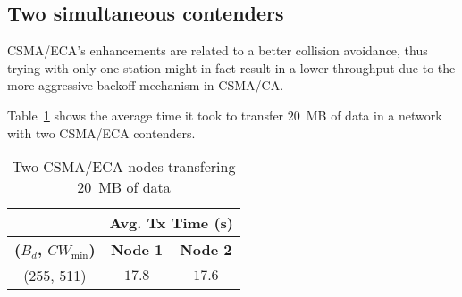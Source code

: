 \documentclass[a4paper]{journal}
\begin{document}
\subsection{Two simultaneous contenders}
CSMA/ECA's enhancements are related to a better collision avoidance, thus trying with only one station might in fact result in a lower throughput due to the more aggressive backoff mechanism in CSMA/CA. 

Table~\ref{tab:beca-transfer-couple} shows the average time it took to transfer $20$~MB of data in a network with two CSMA/ECA contenders.

\begin{table}[htbp]
		\centering
		\caption{Two CSMA/ECA nodes transfering $20$~MB of data}
		\label{tab:beca-transfer-couple}
		\begin{tabular}{|c|c|c|}
			\hline
			\cellcolor{black} & \multicolumn{2}{|c|}{{\bfseries Avg. Tx Time (s)}}\\
			\hline
			{\bfseries ($B_{d}$, $CW_{\min}$)} & {\bfseries Node 1} & {\bfseries Node 2}\\
			\hline
			(255, 511) & $17.8$ & $17.6$\\
			\hline
		\end{tabular}
\end{table} 



\end{document}
